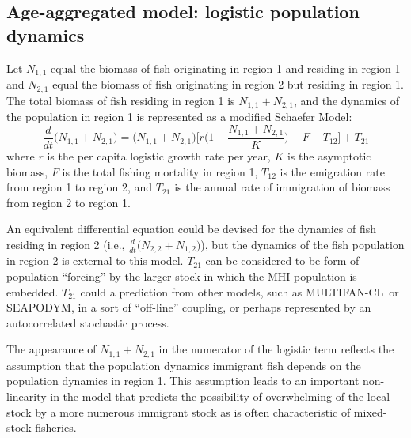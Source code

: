 \documentclass[12pt,letterpaper]{article}
\newcommand\SD{SEAPODYM}
\newcommand\MFCL{MULTIFAN-CL}
\newcommand\None{{N_{1,1}}}
\newcommand\Ntwo{{N_{2,1}}}
\newcommand\Nsum{{N_{1,1}+N_{2,1}}}
\begin{document}
\subsection*{Age-aggregated model: logistic population dynamics}

Let $\None$ equal the biomass of fish originating in region 1
and residing in region 1
and $\Ntwo$ equal the biomass of fish originating in region 2
but residing in region 1.
The total biomass of fish residing in region 1 is
$\Nsum$, and the dynamics of the population in region 1 is represented
as a modified Schaefer Model:
\begin{equation}
\frac{d}{dt}\big(\Nsum\big)=\big(\Nsum\big)\Big[r\Big(1-\frac{\Nsum}{K}\Big)-F-T_{12}\Big]+T_{21}
\label{eqn:logistic}
\end{equation}
where $r$ is the per capita logistic growth rate per year, $K$ is the
asymptotic biomass,
$F$ is the total fishing mortality in region 1, $T_{12}$
is the emigration rate from region 1 to region 2, and $T_{21}$
is the annual rate of immigration of biomass from region 2 to region 1.


An equivalent differential equation could be devised for the dynamics of
fish residing in region 2 
(i.e., $\frac{d}{dt}\big(N_{2,2}+N_{1,2}\big)$), but 
the dynamics of the fish population in region 2 is external to this
model. $T_{21}$ can be considered to be form of population ``forcing''
by the larger stock in which the MHI population is embedded. $T_{21}$
could a prediction from other models, such as \MFCL\ or \SD, in a sort of
``off-line'' coupling, or perhaps represented by an
autocorrelated stochastic process. 

The appearance of
$\Nsum$ in the numerator of the logistic term reflects the assumption
that the population dynamics immigrant fish depends on
the population dynamics in region 1. This assumption leads to an
important non-linearity in the model that predicts the possibility of
overwhelming of the
local stock by a more numerous immigrant stock as is often characteristic of
mixed-stock fisheries.
\end{document}

